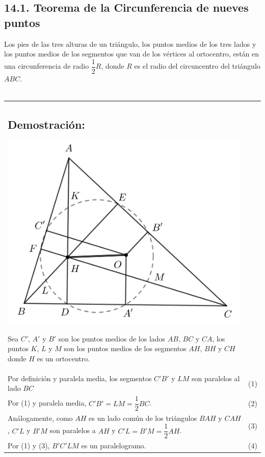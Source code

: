 \documentclass[12pt,a4paper]{article}
\begin{document}
\subsection*{14.1. Teorema de la Circunferencia de nueves puntos}
Los pies de las tres alturas de un triángulo, los puntos medios de los tres lados y los puntos medios de los segmentos que van de los vértices al ortocentro, están en una circunferencia de radio $\dfrac{1}{2}R$, donde $R$ es el radio del circuncentro del triángulo $ABC$.\\\\
\begin{tabular}{p{15.9 cm} p{1cm}}
\subsection*{Demostración:}
\begin{center}
\includegraphics[scale=0.7]{circunferencia nueve.png} 
\end{center}
Sea $C'$, $A'$ y $B'$ son los puntos medios de los lados $AB$, $BC$ y $CA$, los puntos $K$, $L$ y $M$ son los puntos medios de los segmentos $AH$, $BH$ y $CH$ donde $H$ es un ortocentro. 
\\Por definición y paralela media, los segmentos $C'B'$ y $LM$ son paralelos al lado $BC$ &(1)
\\Por (1) y paralela media, $C'B'=LM=\dfrac{1}{2} BC$. &(2)
\\Análogamente, como $AH$ es un lado común de los triángulos $BAH$ y $CAH$, $C'L$ y $B'M$ son paralelos a $AH$ y $C'L=B'M=\dfrac{1}{2} AH$. &\medskip (3)
\\Por (1) y (3), $B'C'LM$ es un paralelogramo. &(4)

\end{tabular}
\end{document}
